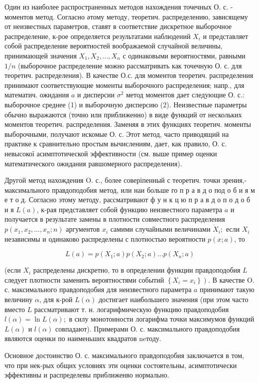 \documentclass[10pt]{article}
\begin{document}
Один из наиболее распространенных методов нахождения точечных О. с. - моментов метод. Согласно әтому методу, теоретич. распределению, зависящему от неизвестных параметров, ставят в соответствие дискретное выборочное распределение, к-рое определяется результатами наблюдений $X_{i}$ и представляет собой распределение вероятностей воображаемой случайной величины, принимающей значения $X_{1}, X_{2}, \ldots, X_{n}$ с одинаковыми вероятностями, равными $1 / n$ (выборочное распределение можно рассматривать как точечную О. с. для теоретич. распределения). В качестве О.с. для моментов теоретич. распределения принимают соответствующие моменты выборочного распределения; напр., для математич. ожидания $a$ и дисперсии $\sigma^{2}$ метод моментов дает следующие О. с.: выборочное среднее (1) и выборочную дисперсию (2). Неизвестные параметры обычно выражаются (точно или приближенно) в виде функций от нескольких моментов теоретич. распределения. Заменяя в этих функциях теоретич. моменты выборочными, получают искомые О. с. Этот метод, часто приводящий на практике к сравнительно простым вычислениям, дает, как правило, О. с. невысокої асимптотической эффективности (см. выше пример оценки математического ожидания равшомерного распределения).

Другой метод нахождения O. с., более соверіпенный с теоретич. точки зрения,- максимального правдоподобия метод, или наи больше го п р а в д о под о б и я м е т о д. Согласно этому методу, рассматривают ф у н к ц ю п р а в д о п о д о б и я $L(a)$, к-рая представляет собой функцию неизвестного параметра $a$ и получается в результате замены в плотности совместного распределения $p\left(x_{1}, x_{2}, \ldots, x_{n} ; n\right)$ аргументов $x_{i}$ самими случайными величинами $\dot{X}_{i} ;$ если $X_{i}$ независимы и одинаково распределены с плотностью вероятности $p(x ; a)$, то

\[
L(a)=p\left(X_{1} ; a\right) p\left(X_{2} ; a\right) \ldots p\left(X_{n} ; a\right)
\]

(если $X_{i}$ распределены дискретно, то в определении функции правдоподобия $L$ следует плотности заменить вероятностями событий $\left.\left\{X_{i}=x_{i}\right\}\right)$. В качестве O. с. максимального правдоподобия для неизвестного параметра $a$ принимают такую величину $\alpha$, для к-рой $L(\alpha)$ достигает наибольшего значения (при этом часто вместо $L$ рассматривают т. н. логарифмическую функцию правдоподобия $l(\alpha)=\ln L(\alpha) ;$ в силу монотонности логарифма точки максимумов функций $L(\alpha)$ и $l(\alpha)$ совпадают). Примерами О. с. максимального правдоподобия являются оценки по наименьших квадратов neтоду.

Основное достоинство О. с. максимального правдоподобия заключается в том, что при нек-рых общих условиях эти оценки состоятельны, асимптотически эффективны и распределевы приближенво нормально.
\end{document}
